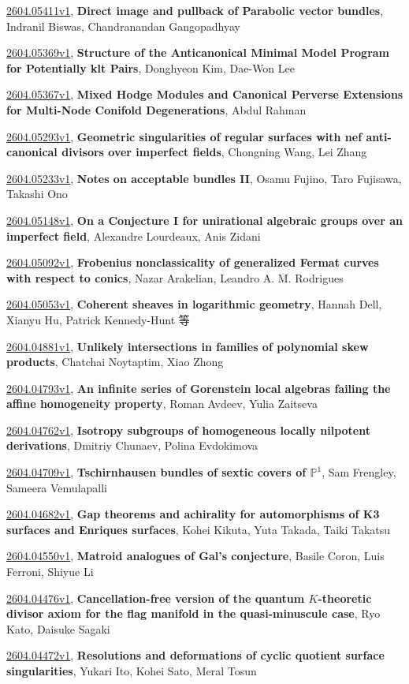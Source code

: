 \documentclass[9pt, a4paper]{article}
\theoremstyle{plain}
\theoremstyle{definition}
\theoremstyle{remark}
\newcommand{\arxiv}[3]{\href{https://arxiv.org/abs/#1}{#1}, \textbf{\textcolor{arxivblue}{#2}}, #3}
\begin{document}
\arxiv{2604.05411v1}{Direct image and pullback of Parabolic vector bundles}{Indranil Biswas, Chandranandan Gangopadhyay}

\arxiv{2604.05369v1}{Structure of the Anticanonical Minimal Model Program for Potentially klt Pairs}{Donghyeon Kim, Dae-Won Lee}

\arxiv{2604.05367v1}{Mixed Hodge Modules and Canonical Perverse Extensions for Multi-Node Conifold Degenerations}{Abdul Rahman}

\arxiv{2604.05293v1}{Geometric singularities of regular surfaces with nef anti-canonical divisors over imperfect fields}{Chongning Wang, Lei Zhang}

\arxiv{2604.05233v1}{Notes on acceptable bundles II}{Osamu Fujino, Taro Fujisawa, Takashi Ono}

\arxiv{2604.05148v1}{On a Conjecture I for unirational algebraic groups over an imperfect field}{Alexandre Lourdeaux, Anis Zidani}

\arxiv{2604.05092v1}{Frobenius nonclassicality of generalized Fermat curves with respect to conics}{Nazar Arakelian, Leandro A. M. Rodrigues}

\arxiv{2604.05053v1}{Coherent sheaves in logarithmic geometry}{Hannah Dell, Xianyu Hu, Patrick Kennedy-Hunt 等}

\arxiv{2604.04881v1}{Unlikely intersections in families of polynomial skew products}{Chatchai Noytaptim, Xiao Zhong}

\arxiv{2604.04793v1}{An infinite series of Gorenstein local algebras failing the affine homogeneity property}{Roman Avdeev, Yulia Zaitseva}

\arxiv{2604.04762v1}{Isotropy subgroups of homogeneous locally nilpotent derivations}{Dmitriy Chunaev, Polina Evdokimova}

\arxiv{2604.04709v1}{Tschirnhausen bundles of sextic covers of $\mathbb{P}^1$}{Sam Frengley, Sameera Vemulapalli}

\arxiv{2604.04682v1}{Gap theorems and achirality for automorphisms of K3 surfaces and Enriques surfaces}{Kohei Kikuta, Yuta Takada, Taiki Takatsu}

\arxiv{2604.04550v1}{Matroid analogues of Gal's conjecture}{Basile Coron, Luis Ferroni, Shiyue Li}

\arxiv{2604.04476v1}{Cancellation-free version of the quantum $K$-theoretic divisor axiom for the flag manifold in the quasi-minuscule case}{Ryo Kato, Daisuke Sagaki}

\arxiv{2604.04472v1}{Resolutions and deformations of cyclic quotient surface singularities}{Yukari Ito, Kohei Sato, Meral Tosun}
\end{document}
